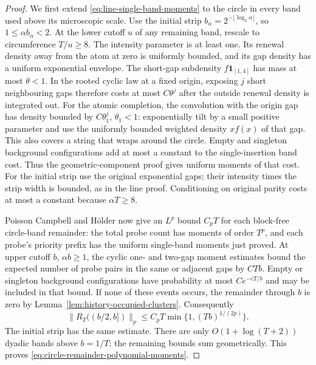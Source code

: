 \documentclass[11pt,letterpaper]{article}
\newcommand{\ind}{\mathbf 1}\newcommand{\Exp}{\operatorname{Exp}}
\begin{document}
\begin{proof}
We first extend \eqref{eq:line-single-band-moments} to the
circle in every band used above its microscopic scale.
Use the initial strip $b_\alpha=2^{-\lfloor\log_2\alpha\rfloor}$,
so $1\le\alpha b_\alpha<2$. At the lower cutoff $u$ of any
remaining band, rescale to circumference $T/u\ge8$.
The intensity parameter is at least one. Its renewal density
away from the atom at zero is uniformly bounded, and its gap
density has a uniform exponential envelope. The short-gap
subdensity $f\ind_{[1,4]}$ has mass at most $\theta<1$.
In the rooted cyclic law at a fixed origin, exposing $j$ short
neighbouring gaps therefore costs at most $C\theta^j$ after
the outside renewal density is integrated out. For the atomic
completion, the convolution with the origin gap has density
bounded by $C\theta_1^j$, $\theta_1<1$: exponentially tilt
by a small positive parameter and use the uniformly bounded
weighted density $x f(x)$ of that gap. This also covers a
string that wraps around the circle. Empty and singleton
background configurations add at most a constant to the
single-insertion band cost. Thus the geometric-component
proof gives uniform moments of that cost. For the initial
strip use the original exponential gaps; their intensity times
the strip width is bounded, as in the line proof. Conditioning
on original parity costs at most a constant because
$\alpha T\ge8$.

Poisson Campbell and H\"older now give an $L^p$ bound $C_pT$
for each block-free circle-band remainder: the total probe
count has moments of order $T^p$, and each probe's priority
prefix has the uniform single-band moments just proved.
At upper cutoff $b$, $\alpha b\ge1$, the cyclic one- and
two-gap moment estimates bound the expected number of probe
pairs in the same or adjacent gaps by $CTb$. Empty or singleton
background configurations have probability at most
$Ce^{-cT/b}$ and may be included in that bound. If none of
these events occurs, the remainder through $b$ is zero by
Lemma~\ref{lem:history-occupied-clusters}. Consequently
\[
 \|R_T((b/2,b])\|_p
                  \le C_pT\min\{1,(Tb)^{1/(2p)}\}.
\]
The initial strip has the same estimate. There are only
$O(1+\log(T+2))$ dyadic bands above $b=1/T$; the remaining
bounds sum geometrically. This proves
\eqref{eq:circle-remainder-polynomial-moments}.
\end{proof}
\end{document}
